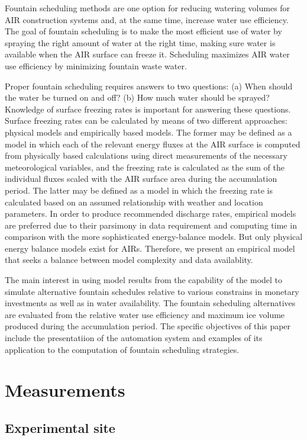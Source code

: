 \documentclass[utf8]{frontiersSCNS}
\begin{document}
Fountain scheduling methods are one option for reducing watering volumes for AIR construction systems and, at
the same time, increase water use efficiency. The goal of fountain scheduling is to make the most efficient use of water by
spraying the right amount of water at the right time, making sure water is available when the AIR surface can
freeze it. Scheduling maximizes AIR water use efficiency by minimizing fountain waste water.  

Proper fountain scheduling requires answers to two questions: (a) When should the water be turned on and off?
(b) How much water should be sprayed? Knowledge of surface freezing rates is important for answering these
questions. Surface freezing rates can be calculated by means of two different approaches: physical
models and empirically based models. The former may be defined as a model in which each of the relevant
energy fluxes at the AIR surface is computed from physically based calculations using direct measurements of the
necessary meteorological variables, and the freezing rate is calculated as the sum of the individual fluxes
scaled with the AIR surface area during the accumulation period. The latter may be defined as a model in which
the freezing rate is calculated based on an assumed relationship with weather and location parameters. In order
to produce recommended discharge rates, empirical models are preferred due to their parsimony in data
requirement and computing time in comparison with the more sophisticated energy-balance models. But only
physical energy balance models exist for AIRs. Therefore, we present an empirical model that seeks a balance
between model complexity and data availablity.

The main interest in using model results from the capability of the model to simulate alternative fountain
schedules relative to various constrains in monetary investments as well as in water availability. The fountain
scheduling alternatives are evaluated from the relative water use efficiency and maximum ice volume produced
during the accumulation period. The specific objectives of this paper include the presentatiion of the
automation system and examples of its application to the computation of fountain scheduling strategies.

\section{Measurements}
\subsection{Experimental site}
\end{document}
